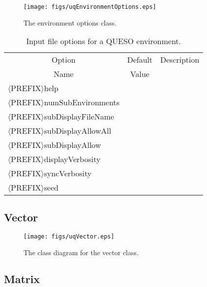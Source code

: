\begin{figure}[h!]
\begin{center}
\texttt{[image: figs/uqEnvironmentOptions.eps]}
\end{center}
\caption{
The environment options class.
}
\label{fig-env-options-class}
\end{figure}

\begin{table}[!h]
\begin{center}
\begin{tabular}{|l|c|c|}
\hline
\multicolumn{1}{|c|}{Option}               & Default & Description \\
\multicolumn{1}{|c|}{Name}                 & Value   &             \\
\hline
\hline
$\langle$PREFIX$\rangle$help               &         &             \\
\hline
$\langle$PREFIX$\rangle$numSubEnvironments &         &             \\
\hline
$\langle$PREFIX$\rangle$subDisplayFileName &         &             \\
\hline
$\langle$PREFIX$\rangle$subDisplayAllowAll &         &             \\
\hline
$\langle$PREFIX$\rangle$subDisplayAllow    &         &             \\
\hline
$\langle$PREFIX$\rangle$displayVerbosity   &         &             \\
\hline
$\langle$PREFIX$\rangle$syncVerbosity      &         &             \\
\hline
$\langle$PREFIX$\rangle$seed               &         &             \\
\hline
\end{tabular}
\end{center}
\caption{
Input file options for a QUESO environment.
}
\label{tab-env-options}
\end{table}

\clearpage
\subsection{Vector}

\begin{figure}[h!]
\centerline{
\texttt{[image: figs/uqVector.eps]}
}
\caption{
The class diagram for the vector class.
}
\label{fig-vector-class}
\end{figure}

\clearpage
\subsection{Matrix}

